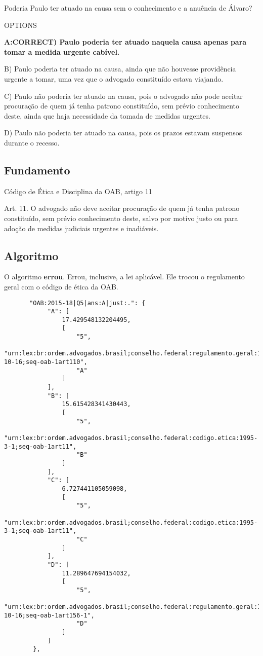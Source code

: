 \documentclass[12pt]{article}
\begin{document}
Poderia Paulo ter atuado na causa sem o conhecimento e a 
anuência de Álvaro? 

OPTIONS

\textbf{A:CORRECT) Paulo poderia ter atuado naquela causa apenas para tomar 
a medida urgente cabível.} 

B) Paulo poderia ter atuado na causa, ainda que não 
houvesse providência urgente a tomar, uma vez que o 
advogado constituído estava viajando. 

C) Paulo não poderia ter atuado na causa, pois o advogado 
não pode aceitar procuração de quem já tenha patrono 
constituído, sem prévio conhecimento deste, ainda que 
haja necessidade da tomada de medidas urgentes. 

D) Paulo não poderia ter atuado na causa, pois os prazos 
estavam suspensos durante o recesso. 

\subsection{Fundamento}

Código de Ética e Disciplina da OAB, artigo 11

Art. 11. O advogado não deve aceitar procuração de quem já tenha patrono constituído, sem prévio conhecimento deste, salvo por motivo justo ou para adoção de medidas
judiciais urgentes e inadiáveis.


\subsection{Algoritmo}

O algoritmo \textbf{errou}. Errou, inclusive, a lei aplicável. Ele trocou o regulamento geral com o código de ética da OAB.

\begin{lstlisting}
       "OAB:2015-18|Q5|ans:A|just:.": {
            "A": [
                17.429548132204495,
                [
                    "5",
                    "urn:lex:br:ordem.advogados.brasil;conselho.federal:regulamento.geral:1994-10-16;seq-oab-1art110",
                    "A"
                ]
            ],
            "B": [
                15.615428341430443,
                [
                    "5",
                    "urn:lex:br:ordem.advogados.brasil;conselho.federal:codigo.etica:1995-3-1;seq-oab-1art11",
                    "B"
                ]
            ],
            "C": [
                6.727441105059098,
                [
                    "5",
                    "urn:lex:br:ordem.advogados.brasil;conselho.federal:codigo.etica:1995-3-1;seq-oab-1art11",
                    "C"
                ]
            ],
            "D": [
                11.289647694154032,
                [
                    "5",
                    "urn:lex:br:ordem.advogados.brasil;conselho.federal:regulamento.geral:1994-10-16;seq-oab-1art156-1",
                    "D"
                ]
            ]
        },

\end{lstlisting}
\end{document}
